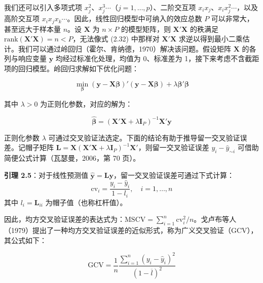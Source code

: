 \documentclass{ctexart}
\begin{document}
我们还可以引入多项式项 $x_j^2、x_j^3\cdots$（$j=1,\dots,p$）、二阶交互项 $x_ix_j$、$x_ix_j^2\cdots$，以及高阶交互项 $x_ix_jx_k\cdots$。因此，线性回归模型中可纳入的效应总数 $P$ 可以非常大，甚至远大于样本量 $n$。设 $\boldsymbol{X}$ 为 $n\times P$ 的模型矩阵，则 $\boldsymbol{X}'\boldsymbol{X}$ 的秩满足 $\mathrm{rank}(\boldsymbol{X}'\boldsymbol{X})=n < P$，无法像式 (2.32) 中那样对 $\boldsymbol{X}'\boldsymbol{X}$ 求逆以得到最小二乘估计。我们可以通过岭回归（霍尔、肯纳德，1970）解决该问题。假设矩阵 $\boldsymbol{X}$ 的各列与响应变量 $\boldsymbol{y}$ 均经过标准化处理，均值为 0、标准差为 1，接下来考虑不含截距项的回归模型。岭回归求解如下优化问题：

\begin{equation*}
\min_{\boldsymbol{\beta}}(\boldsymbol{y}-\boldsymbol{X}\boldsymbol{\beta})'(\boldsymbol{y}-\boldsymbol{X}\boldsymbol{\beta})+\lambda\boldsymbol{\beta}'\boldsymbol{\beta}
\tag{2.39}
\end{equation*}

其中 $\lambda>0$ 为正则化参数，对应的解为：

\begin{equation*}
\widehat{\boldsymbol{\beta}}=(\boldsymbol{X}'\boldsymbol{X}+\lambda\boldsymbol{I}_P)^{-1}\boldsymbol{X}'\boldsymbol{y}
\tag{2.40}
\end{equation*}

正则化参数 $\lambda$ 可通过交叉验证法选定。下面的结论有助于推导留一交叉验证误差。记帽子矩阵 $\boldsymbol{L}=\boldsymbol{X}(\boldsymbol{X}'\boldsymbol{X}+\lambda\boldsymbol{I}_P)^{-1}\boldsymbol{X}'$，则留一交叉验证误差 $y_i-\widehat{y}_{\sim i}$ 可借助简便公式计算（瓦瑟曼，2006，第 70 页）。

\begin{mdquote}
\textbf{引理 2.5}：对于线性预测值 $\widehat{\boldsymbol{y}}=\boldsymbol{L}\boldsymbol{y}$，留一交叉验证误差可通过下式计算： \begin{equation*}
\mathrm{cv}_i=\frac{y_i-\widehat{y}_i}{1-l_i},\quad i=1,\dots,n
\end{equation*} 其中 $l_i=\boldsymbol{L}_{ii}$ 为帽子值（也称杠杆值）。
\end{mdquote}

因此，均方交叉验证误差的表达式为：$\mathrm{MSCV}=\sum_{i=1}^{n}\mathrm{cv}_i^2/n$。戈卢布等人（1979）提出了一种均方交叉验证误差的近似形式，称为广义交叉验证（GCV），其公式如下：

\begin{equation*}
\mathrm{GCV}=\frac{1}{n}\frac{\sum_{i=1}^{n}(y_i-\widehat{y}_i)^2}{(1-\overline{l})^2}
\end{equation*}
\end{document}
